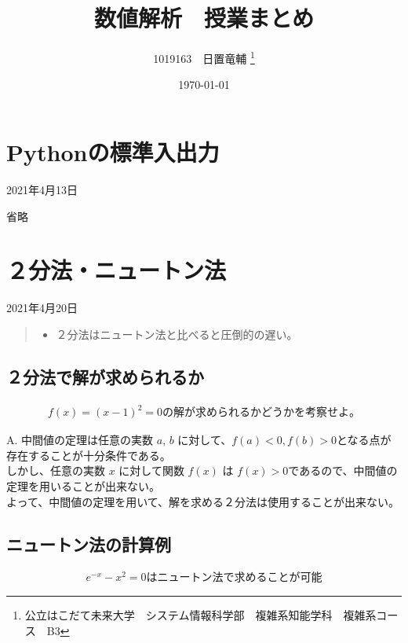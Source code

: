 \documentclass[dvipdfmx,uplatex]{jsarticle}
\title{数値解析　授業まとめ}
\author{1019163　日置竜輔 \thanks{公立はこだて未来大学　システム情報科学部　複雑系知能学科　複雑系コース　B3}}
\date{\today}
\begin{document}
\begin{spacing}{1.4}

\maketitle
\tableofcontents %

\newpage

\section{Pythonの標準入出力}
\begin{center}
  2021年4月13日 \\
\end{center}
省略
\newpage

\section{２分法・ニュートン法}
\begin{center}
  2021年4月20日 \\
\end{center}

\begin{quote}
 \begin{itemize}
  \item ２分法はニュートン法と比べると圧倒的の遅い。
 \end{itemize}
\end{quote}

\subsection{２分法で解が求められるか}
\begin{eqnarray}
  f(x) = (x - 1)^2 = 0の解が求められるかどうかを考察せよ。
\end{eqnarray}

A. 中間値の定理は任意の実数 $a$, $b$ に対して、$f(a) < 0 , f(b) > 0$となる点が存在することが十分条件である。 \\
しかし、任意の実数 $x$ に対して関数 $f(x)$ は $f(x) > 0$であるので、中間値の定理を用いることが出来ない。 \\
よって、中間値の定理を用いて、解を求める２分法は使用することが出来ない。

\subsection{ニュートン法の計算例}
\begin{eqnarray}
  e^{-x} - x^2 = 0はニュートン法で求めることが可能
\end{eqnarray}
\newpage


\end{spacing}
\end{document}
